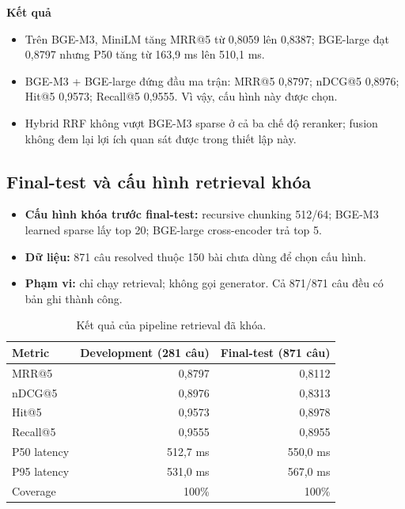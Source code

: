 \noindent\textbf{Kết quả}
\begin{itemize}
  \item Trên BGE-M3, MiniLM tăng MRR@5 từ 0,8059 lên 0,8387; BGE-large đạt
  0,8797 nhưng P50 tăng từ 163,9 ms lên 510,1 ms.
  \item BGE-M3 + BGE-large đứng đầu ma trận: MRR@5 0,8797; nDCG@5 0,8976;
  Hit@5 0,9573; Recall@5 0,9555. Vì vậy, cấu hình này được chọn.
  \item Hybrid RRF không vượt BGE-M3 sparse ở cả ba chế độ reranker; fusion
  không đem lại lợi ích quan sát được trong thiết lập này.
\end{itemize}

\subsection{Final-test và cấu hình retrieval khóa}

\begin{itemize}
  \item \textbf{Cấu hình khóa trước final-test:} recursive chunking 512/64;
  BGE-M3 learned sparse lấy top 20; BGE-large cross-encoder trả top 5.
  \item \textbf{Dữ liệu:} 871 câu resolved thuộc 150 bài chưa dùng để chọn cấu
  hình.
  \item \textbf{Phạm vi:} chỉ chạy retrieval; không gọi generator. Cả 871/871
  câu đều có bản ghi thành công.
\end{itemize}

\begin{table}[H]
  \centering
  \caption{Kết quả của pipeline retrieval đã khóa.}
  \label{tab:phase1-final-test}
  \small
  \begin{tabular}{lrr}
    \toprule
    \textbf{Metric} & \textbf{Development (281 câu)} &
    \textbf{Final-test (871 câu)} \\
    \midrule
    MRR@5       & 0,8797 & 0,8112 \\
    nDCG@5      & 0,8976 & 0,8313 \\
    Hit@5       & 0,9573 & 0,8978 \\
    Recall@5    & 0,9555 & 0,8955 \\
    P50 latency & 512,7 ms & 550,0 ms \\
    P95 latency & 531,0 ms & 567,0 ms \\
    Coverage    & 100\% & 100\% \\
    \bottomrule
  \end{tabular}
\end{table}

